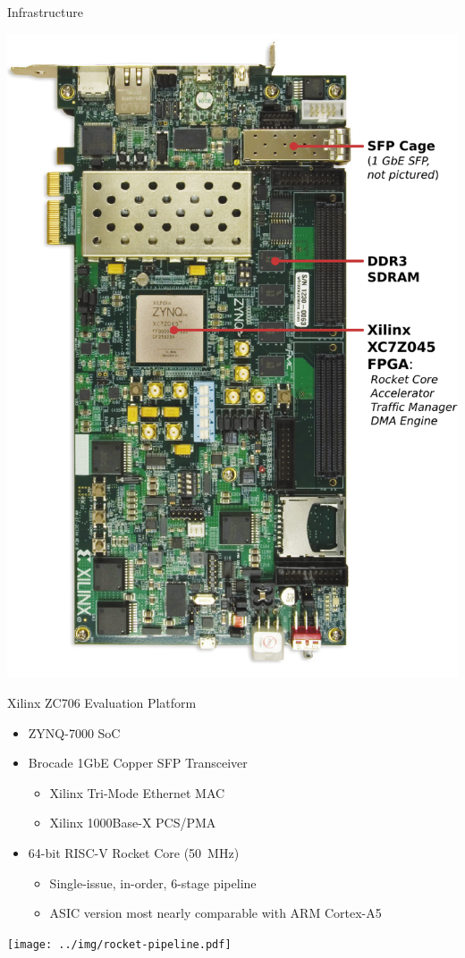 \begin{block}{Infrastructure}
\footnotesize

\begin{minipage}{0.4\linewidth}
\includegraphics[width=\linewidth]{../img/zc706.pdf}
\end{minipage}
\hfill
\begin{minipage}{0.55\linewidth}
\alert{Xilinx ZC706 Evaluation Platform}
\begin{itemize}
\item ZYNQ-7000 SoC
\item Brocade 1GbE Copper SFP Transceiver
	\begin{itemize}
	\footnotesize
        \item Xilinx Tri-Mode Ethernet MAC
        \item Xilinx 1000Base-X PCS/PMA
	\end{itemize}
\item 64-bit RISC-V Rocket Core (\SI{50}{\mega\hertz})
	\begin{itemize}
	\footnotesize
	\item Single-issue, in-order, 6-stage pipeline
	\item ASIC version most nearly comparable with ARM Cortex-A5
	\end{itemize}
\end{itemize}
\vspace{\baselineskip}
\texttt{[image: ../img/rocket-pipeline.pdf]}
\end{minipage}


\end{block}
